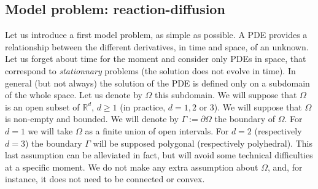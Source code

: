 \documentclass{article}
\begin{document}





\subsection{Model problem: reaction-diffusion}

Let us introduce a first model problem, as simple as possible. A PDE provides a relationship between the different derivatives, in time and space, of an unknown. Let us forget about time for the moment and consider only PDEs in space, that correspond to \emph{stationnary} problems (the solution does not evolve in time). In general (but not always) the solution of the PDE is defined only on a subdomain of the whole space. Let us denote by $\Omega$ this subdomain. We will suppose that $\Omega$ is an open subset of $\mathbb{R}^d$, $d\geq1$ (in practice, $d=1,2$ or $3$). We will suppose that $\Omega$ is non-empty and bounded. We will denote by $\Gamma:= \partial \Omega$ the boundary of $\Omega$.
For $d=1$ we will take $\Omega$ as a finite union of open intervals. For $d=2$ (respectively $d=3$) the boundary $\Gamma$ will be supposed polygonal (respectively polyhedral). This last assumption can be alleviated in fact, but will avoid some technical difficulties at a specific moment. We do not make any extra assumption about $\Omega$, and, for instance, it does not need to be connected or convex.
\end{document}
